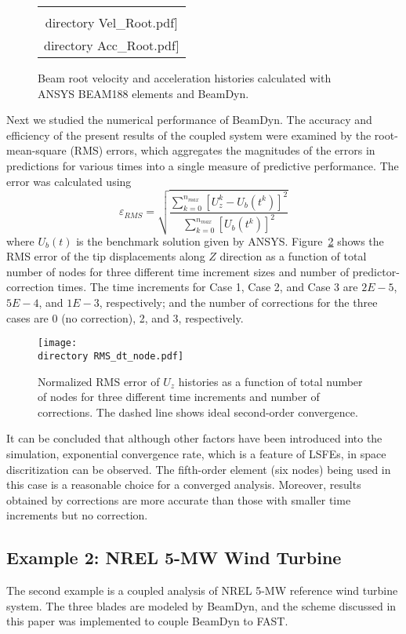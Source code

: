 \documentclass{aiaa-tc}
\def\directory{EPSF/}
\begin{document}
 \begin{figure}
    \centering
    \begin{tabular}{c}
    \subfloat[Root Velocity]{\label{fig:E1VelRoot}\texttt{[image: \\directory  Vel\_Root.pdf]}} \qquad
\subfloat[Root Acceleration]{\label{fig:E1AccRoot}\texttt{[image: \\directory  Acc\_Root.pdf]}}\\
\end{tabular}
\caption{Beam root velocity and acceleration histories calculated with ANSYS BEAM188 elements and BeamDyn.}
\label{fig:E1VelAcc}
\end{figure} 

Next we studied the numerical performance of BeamDyn. The accuracy and efficiency of the present results of the coupled system were examined by the root-mean-square (RMS) errors, which aggregates the magnitudes of the errors in predictions for various times into a single measure of predictive performance. The error was calculated using
\begin{equation}
\varepsilon_{RMS}=\sqrt{\frac{\sum_{k=0}^{n_{max}}[U_z^k-U_b(t^k)]^2}{\sum_{k=0}^{n_{max}}[U_b(t^k)]^2}}
\label{RMSdefi}
\end{equation} 
where $U_b(t)$ is the benchmark solution given by ANSYS. Figure~\ref{fig:ConvDTNode} shows the RMS error of the tip displacements along $Z$ direction as a function of total number of nodes for three different time increment sizes and number of predictor-correction times. The time increments for Case 1, Case 2, and Case 3 are $2E-5$, $5E-4$, and $1E-3$, respectively; and the number of corrections for the three cases are 0 (no correction), 2, and 3, respectively.
\begin{figure}
\centering
\texttt{[image: \\directory RMS\_dt\_node.pdf]}
\caption{Normalized RMS error of $U_z$ histories as a function of total number of nodes for three different time increments and number of corrections. The dashed line shows ideal second-order convergence.} 
\label{fig:ConvDTNode}
\end{figure}
It can be concluded that although other factors have been introduced into the simulation, exponential convergence rate, which is a feature of LSFEs, in space discritization can be observed. The fifth-order element (six nodes) being used in this case is a reasonable choice for a converged analysis. Moreover, results obtained by corrections are more accurate than those with smaller time increments but no correction.

\subsection{Example 2: NREL 5-MW Wind Turbine}
The second example is a coupled analysis of NREL 5-MW reference wind turbine system. The three blades are modeled by BeamDyn, and the scheme discussed in this paper  was implemented to couple BeamDyn to FAST. 
\end{document}

